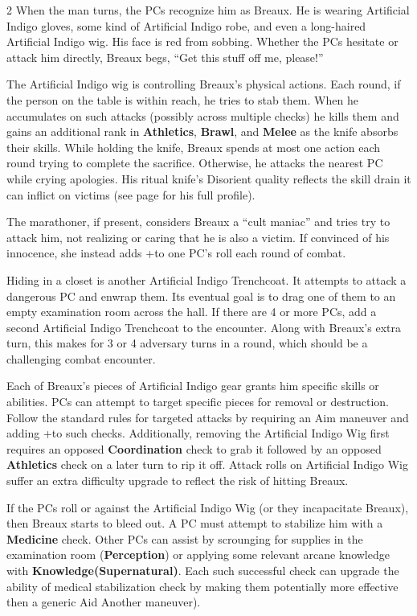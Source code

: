 \documentclass{book}
\newcommand{\df}{\DifficultyDie }
\newcommand{\stb}{\SetbackDie }
\newcommand{\bbb}{\BoostDie }
\newcommand{\ai}{{\color{cyan}Artificial Indigo}\xspace}
\begin{document}
\begin{multicols*}{2}
When the man turns, the PCs recognize him as Breaux.  He is wearing \ai gloves, some kind of \ai robe, and even a long-haired \ai wig.  His face is red from sobbing.  Whether the PCs hesitate or attack him directly, Breaux begs, ``Get this stuff off me, please!''

The \ai wig is controlling Breaux's physical actions.  Each round, if the person on the table is within reach, he tries to stab them.  When he accumulates  \Success\Success\Success {}on such attacks (possibly across multiple checks) he kills them and gains an additional rank in \textbf{Athletics}, \textbf{Brawl}, and \textbf{Melee} as the knife absorbs their skills.  While holding the knife, Breaux spends at most one action each round trying to complete the sacrifice.  Otherwise, he attacks the nearest PC while crying apologies.  His ritual knife's Disorient quality reflects the skill drain it can inflict on victims (see page \pageref{ad:breaux} for his full profile).

The marathoner, if present, considers Breaux a ``cult maniac'' and tries try to attack him, not realizing or caring that he is also a victim.  If convinced of his innocence, she instead adds +\bbb to one PC's roll each round of combat.

Hiding in a closet is another \ai Trenchcoat.  It attempts to attack a dangerous PC and enwrap them.  Its eventual goal is to drag one of them to an empty examination room across the hall.  If there are 4 or more PCs, add a second \ai Trenchcoat to the encounter.  Along with Breaux's extra turn, this makes for 3 or 4 adversary turns in a round, which should be a challenging combat encounter.

Each of Breaux's pieces of \ai gear grants him specific skills or abilities.  PCs can attempt to target specific pieces for removal or destruction.  Follow the standard rules for targeted attacks by requiring an Aim maneuver and adding +\stb\stb to such checks.  Additionally, removing the \ai Wig first requires an opposed \textbf{Coordination} check to grab it followed by an opposed \textbf{Athletics} check on a later turn to rip it off.  Attack rolls on \ai Wig suffer an extra difficulty upgrade to reflect the risk of hitting Breaux.

If the PCs roll \Despair { }or \Threat\Threat\Threat { }against the \ai Wig (or they incapacitate Breaux), then Breaux starts to bleed out.  A PC must attempt to stabilize him with a \df\df\df \textbf{Medicine} check.  Other PCs can assist by scrounging for supplies in the examination room (\df\df\bbb \textbf{Perception}) or applying some relevant arcane knowledge with \df\df \textbf{Knowledge(Supernatural)}.  Each such successful check can upgrade the ability of medical stabilization check by making them potentially more effective then a generic Aid Another maneuver).


\end{multicols*}
\end{document}
